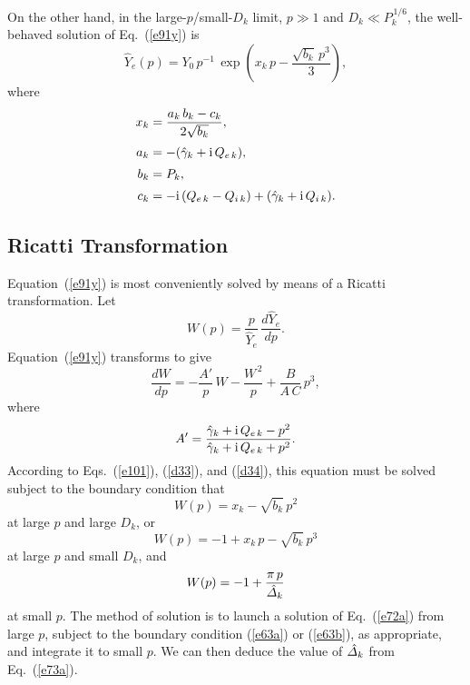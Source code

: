 \documentclass[12pt,prb,aps]{revtex4-1}
\begin{document}
On the other hand, in the large-$p$/small-$D_k$ limit, $p\gg 1$ and $D_k\ll P_k^{\,1/6}$, the well-behaved solution of Eq.~(\ref{e91y}) is
\begin{equation}\label{d34}
\hat{Y}_e(p) = Y_0 \,p^{-1}\,\exp\left(x_k\,p - \frac{\sqrt{b_k}\,p^3}{3}\right),
\end{equation}
where
\begin{align}
x_k &= \frac{a_k\,b_k-c_k}{2\sqrt{b_k}},\\[0.5ex]
a_k&=  -(\hat{\gamma}_k+ {\rm i}\,Q_{e\,k}),\\[0.5ex]
b_k&= P_k,\\[0.5ex]
c_k&= -{\rm i}\,(Q_{e\,k}-Q_{i\,k}) + (\hat{\gamma}_k+ {\rm i}\,Q_{i\,k}).
\end{align}

\subsection{Ricatti Transformation}
Equation~(\ref{e91y}) is most conveniently solved by means of a Ricatti transformation.\cite{ric1,ric2}
Let 
\begin{equation}
W(p)= \frac{p}{\hat{Y}_e}\,\frac{d\hat{Y}_e}{dp}.
\end{equation}
Equation~(\ref{e91y}) transforms to give
\begin{equation}\label{e72a}
\frac{dW}{dp} =- \frac{A'}{p}\,W -\frac{W^{\,2}}{p} + \frac{B}{A\,C}\,p^3,
\end{equation}
where
\begin{equation}
A' = \frac{\hat{\gamma}_k+{\rm i}\,Q_{e\,k}-p^2}{\hat{\gamma}_k+{\rm i}\,Q_{e\,k}+p^2}.
\end{equation}
According to Eqs.~(\ref{e101}), (\ref{d33}), and (\ref{d34}), this equation must be solved subject to the boundary condition that
\begin{equation}\label{e63a}
W(p) = x_k-\sqrt{b_k}\,p^2
\end{equation}
at large $p$ and large $D_k$, or
\begin{equation}\label{e63b}
W(p) = -1 +x_k\,p-\sqrt{b_k}\,p^3
\end{equation}
at large $p$ and small $D_k$, and 
\begin{equation}\label{e73a}
W (p)=-1+\frac{\pi\,p}{\hat{\mit\Delta}_k}
\end{equation}
at small $p$. 
The method of solution is to  launch a solution of Eq.~(\ref{e72a})  from large $p$, subject to the  boundary condition (\ref{e63a}) or (\ref{e63b}), as appropriate,  and
integrate it to small $p$. We can then deduce the value of $\hat{\mit\Delta}_k$ from Eq.~(\ref{e73a}). 
\end{document}
